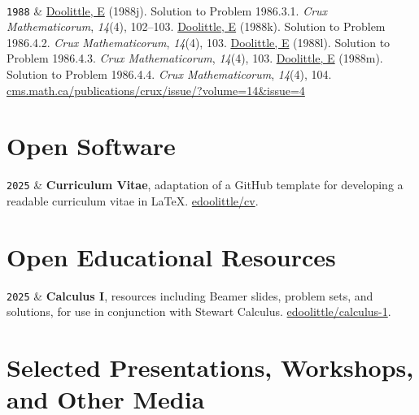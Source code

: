 \documentclass[9pt,a4paper]{article}
\newcommand{\LastName}{Doolittle}
\newcommand{\Initials}{E}
\newcommand{\Me}{\underline{\LastName, \Initials}}  %
\newcommand{\Year}[1]{\fontsize{10pt}{0}\selectfont \texttt{#1}}
\newcommand{\Website}[1]{\href{https://#1}{#1}}
\newcommand{\GitHub}[1]{\faGithub{} \href{https://github.com/#1}{#1}}
\begin{document}
\begin{EntriesTableYear}
  \\
  \Year{1988} & \Me{} (1988j).  Solution to Problem 1986.3.1.  \textit{Crux
  Mathematicorum}, \textit{14}(4), 102--103.  %
  \newline %
  \Me{} (1988k).  Solution to Problem 1986.4.2.  \textit{Crux Mathematicorum},
  \textit{14}(4), 103.  %
  \newline %
  \Me{} (1988l).  Solution to Problem 1986.4.3.  \textit{Crux Mathematicorum},
  \textit{14}(4), 103.  %
  \newline %
  \Me{} (1988m).  Solution to Problem 1986.4.4.  \textit{Crux Mathematicorum},
  \textit{14}(4), 104.  %
  \newline %
  \Website{cms.math.ca/publications/crux/issue/?volume=14\&issue=4}
\end{EntriesTableYear}
      
\section{Open Software}

\begin{EntriesTableYear}
  \Year{2025} & \textbf{Curriculum Vitae}, adaptation of a GitHub
  template for developing a readable curriculum vitae in \LaTeX.
  \GitHub{edoolittle/cv}.
\end{EntriesTableYear}

\section{Open Educational Resources}

\begin{EntriesTableYear}
  \Year{2025} & \textbf{Calculus I}, resources including Beamer
  slides, problem sets, and solutions, for use in conjunction with
  Stewart Calculus.  \GitHub{edoolittle/calculus-1}.
\end{EntriesTableYear}

\section{Selected Presentations, Workshops, and Other Media}
\end{document}
